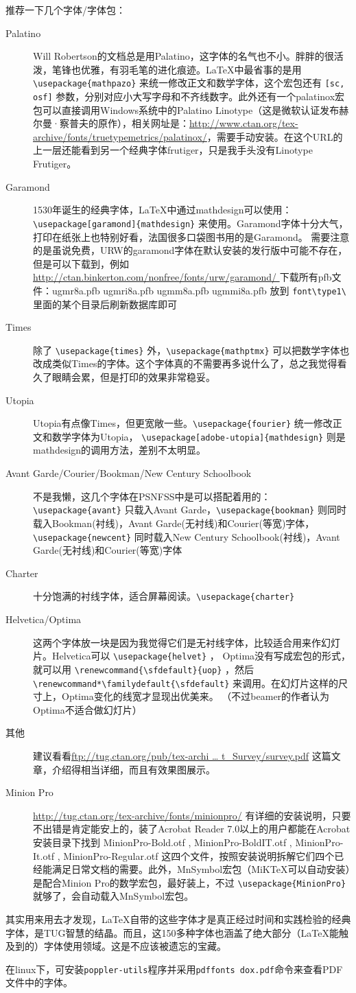 推荐一下几个字体/字体包：
\begin{description}
	\item[Palatino] Will Robertson的文档总是用Palatino，这字体的名气也不小。胖胖的很活泼，笔锋也优雅，有羽毛笔的进化痕迹。LaTeX中最省事的是用 \verb|\usepackage{mathpazo}| 来统一修改正文和数学字体，这个宏包还有 \verb|[sc, osf]| 参数，分别对应小大写字母和不齐线数字。此外还有一个palatinox宏包可以直接调用Windows系统中的Palatino Linotype（这是微软认证发布赫尔曼·察普夫的原作），相关网址是：\url{http://www.ctan.org/tex-archive/fonts/truetypemetrics/palatinox/}，需要手动安装。在这个URL的上一层还能看到另一个经典字体frutiger，只是我手头没有Linotype Frutiger。 
	\item[Garamond] 1530年诞生的经典字体，LaTeX中通过mathdesign可以使用： \verb|\usepackage[garamond]{mathdesign}| 来使用。Garamond字体十分大气，打印在纸张上也特别好看，法国很多口袋图书用的是Garamond。 需要注意的是虽说免费，URW的garamond字体在默认安装的发行版中可能不存在，但是可以下载到，例如\url{http://ctan.binkerton.com/nonfree/fonts/urw/garamond/ }下载所有pfb文件：ugmr8a.pfb ugmri8a.pfb ugmm8a.pfb ugmmi8a.pfb 放到 \verb|font\type1\| 里面的某个目录后刷新数据库即可 
	\item[Times] 除了 \verb|\usepackage{times}| 外，\verb|\usepackage{mathptmx}| 可以把数学字体也改成类似Times的字体。这个字体真的不需要再多说什么了，总之我觉得看久了眼睛会累，但是打印的效果非常稳妥。
	\item[Utopia] Utopia有点像Times，但更宽敞一些。\verb|\usepackage{fourier}| 统一修改正文和数学字体为Utopia， \verb|\usepackage[adobe-utopia]{mathdesign}| 则是mathdesign的调用方法，差别不太明显。
	\item[Avant Garde/Courier/Bookman/New Century Schoolbook] 
不是我懒，这几个字体在PSNFSS中是可以搭配着用的：\verb|\usepackage{avant}| 只载入Avant Garde，\verb|\usepackage{bookman}| 则同时载入Bookman(衬线)，Avant Garde(无衬线)和Courier(等宽)字体，\verb|\usepackage{newcent}| 同时载入New Century Schoolbook(衬线)，Avant Garde(无衬线)和Courier(等宽)字体 
	\item[Charter] 十分饱满的衬线字体，适合屏幕阅读。\verb|\usepackage{charter}|
	\item[Helvetica/Optima] 这两个字体放一块是因为我觉得它们是无衬线字体，比较适合用来作幻灯片。Helvetica可以 \verb|\usepackage{helvet}| ， Optima没有写成宏包的形式，就可以用 \verb|\renewcommand{\sfdefault}{uop}| ，然后 \verb|\renewcommand*\familydefault{\sfdefault}| 来调用。在幻灯片这样的尺寸上，Optima变化的线宽才显现出优美来。 （不过beamer的作者认为Optima不适合做幻灯片）
	\item[其他] 建议看看\url{ftp://tug.ctan.org/pub/tex-archi … t_Survey/survey.pdf} 这篇文章，介绍得相当详细，而且有效果图展示。 
	\item[Minion Pro] \url{http://tug.ctan.org/tex-archive/fonts/minionpro/} 有详细的安装说明，只要不出错是肯定能安上的，装了Acrobat Reader 7.0以上的用户都能在Acrobat安装目录下找到 MinionPro-Bold.otf , MinionPro-BoldIT.otf , MinionPro-It.otf , MinionPro-Regular.otf 这四个文件，按照安装说明拆解它们四个已经能满足日常文档的需要。此外，MnSymbol宏包（MiKTeX可以自动安装）是配合Minion Pro的数学宏包，最好装上，不过 \verb|\usepackage{MinionPro}| 就够了，会自动载入MnSymbol宏包。
\end{description}

其实用来用去才发现，LaTeX自带的这些字体才是真正经过时间和实践检验的经典字体，是TUG智慧的结晶。而且，这150多种字体也涵盖了绝大部分（LaTeX能触及到的）字体使用领域。这是不应该被遗忘的宝藏。

在linux下，可安装\verb|poppler-utils|程序并采用\verb|pdffonts dox.pdf|命令来查看PDF文件中的字体。